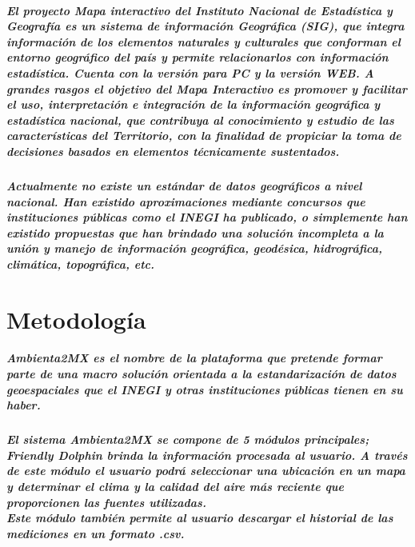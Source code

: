 \documentclass[12pt]{report}
\begin{document}
  \paragraph{El proyecto Mapa interactivo del Instituto Nacional de Estadística y Geografía es un sistema de información Geográfica (SIG), que integra información de los elementos naturales  y culturales que conforman el entorno geográfico del país y permite relacionarlos con información estadística. Cuenta con la versión para PC y la versión WEB. A grandes rasgos el objetivo del Mapa Interactivo es promover y facilitar el uso, interpretación e integración de la información geográfica y estadística nacional, que contribuya al conocimiento y estudio de las características del Territorio, con la finalidad de propiciar la toma de decisiones basados en elementos técnicamente sustentados.}

  \paragraph{Actualmente no existe un estándar de datos geográficos a nivel nacional. Han existido aproximaciones mediante concursos que instituciones públicas como el INEGI ha publicado, o simplemente han existido propuestas que han brindado una solución incompleta a la unión y manejo de información geográfica, geodésica, hidrográfica, climática, topográfica, etc.}

\chapter{Metodología}
  \paragraph{Ambienta2MX es el nombre de la plataforma que pretende formar parte de una macro solución orientada a la estandarización de datos geoespaciales que el INEGI y otras instituciones públicas tienen en su haber.}
  \paragraph{El sistema Ambienta2MX se compone de 5 módulos principales; Friendly Dolphin brinda la información procesada al usuario. A través de este módulo el usuario podrá seleccionar una ubicación en un mapa y determinar el clima y la calidad del aire más reciente que proporcionen las fuentes utilizadas. \\ Este módulo también permite al usuario descargar el historial de las mediciones en un formato .csv.}
\end{document}
